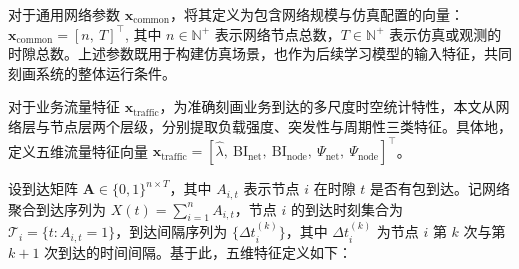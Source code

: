 对于通用网络参数 $\mathbf{x}_{\mathrm{common}}$，将其定义为包含网络规模与仿真配置的向量：
$\mathbf{x}_{\mathrm{common}} = [n,\ T]^{\top}$,
其中 $n \in \mathbb{N}^+$ 表示网络节点总数，$T \in \mathbb{N}^+$ 表示仿真或观测的时隙总数。上述参数既用于构建仿真场景，也作为后续学习模型的输入特征，共同刻画系统的整体运行条件。

对于业务流量特征 $\mathbf{x}_{\text{traffic}}$，为准确刻画业务到达的多尺度时空统计特性，本文从网络层与节点层两个层级，分别提取负载强度、突发性与周期性三类特征。具体地，定义五维流量特征向量 $\mathbf{x}_{\text{traffic}} = [\hat{\lambda},\ \mathrm{BI}_{\mathrm{net}},\ \mathrm{BI}_{\mathrm{node}},\ \Psi_{\mathrm{net}},\ \Psi_{\mathrm{node}}]^{\top}$。

设到达矩阵 $\mathbf{A} \in \{0,1\}^{n \times T}$，其中 $A_{i,t}$ 表示节点 $i$ 在时隙 $t$ 是否有包到达。记网络聚合到达序列为 $X(t) = \sum_{i=1}^{n} A_{i,t}$，节点 $i$ 的到达时刻集合为 $\mathcal{T}_i = \{t : A_{i,t} = 1\}$，到达间隔序列为 $\{\Delta t_i^{(k)}\}$，其中 $\Delta t_i^{(k)}$ 为节点 $i$ 第 $k$ 次与第 $k+1$ 次到达的时间间隔。基于此，五维特征定义如下：

